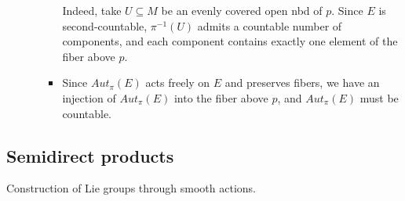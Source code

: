 \documentclass{report}
\theoremstyle{definition}
\begin{document}
\begin{itemize}
\begin{itemize}
\begin{itemize}
            Indeed, take $U\subseteq M$ be an evenly covered open nbd of $p$. Since $E$ is second-countable, $\pi^{-1}(U)$ admits a countable number of components, and each component contains exactly one element of the fiber above $p$.
            \item Since $Aut_\pi(E)$ acts freely on $E$ and preserves fibers, we have an injection of $Aut_\pi(E)$ into the fiber above $p$, and $Aut_\pi(E)$ must be countable.
        \end{itemize}
    \end{itemize}
\end{itemize}

\subsection{Semidirect products}

Construction of Lie groups through smooth actions.
\end{document}
